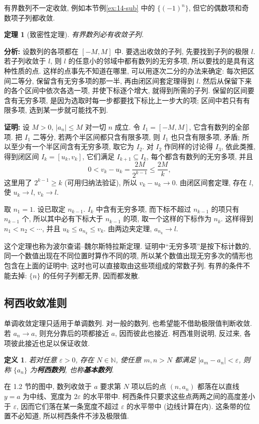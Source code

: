 \documentclass[UTF8,openany]{ctexbook}
\theoremstyle{chinesetextbook}
\newtheorem{definition}{定义}[section]
\newtheorem{theorem}{定理}[section]
\newenvironment{cnproof}{\par\indent\textbf{证明:} \ignorespaces}{\par}
\begin{document}
有界数列不一定收敛, 例如本节例\ref{ex:14-sub} 中的 $\{(-1)^n\}$, 但它的偶数项和奇数项子列都收敛.
\begin{theorem}[致密性定理]
有界数列必有收敛子列.
\end{theorem}
\par\indent\textbf{分析:} 设数列的各项都在 $[-M,M]$ 中. 要选出收敛的子列, 先要找到子列的极限 $l$. 若子列收敛于 $l$, 则 $l$ 的任意小的邻域中都有数列的无穷多项, 所以要找的是具有这种性质的点. 这样的点事先不知道在哪里, 可以用逐次二分的办法来确定: 每次把区间二等分, 保留含有无穷多项的那一半, 再由闭区间套定理得到 $l$. 然后从保留下来的各个区间中依次各选一项, 并使下标逐个增大, 就得到所需的子列. 保留的区间要含有无穷多项, 是因为选取时每一步都要找下标比上一步大的项; 区间中若只有有限多项, 选到某一步就可能找不到.
\begin{cnproof}
设 $M>0$, $|a_n|\le M$ 对一切 $n$ 成立. 令 $I_1=[-M,M]$, 它含有数列的全部项. 把 $I_1$ 二等分, 若两个半区间都只含有限多项, 则 $I_1$ 也只含有限多项, 矛盾; 所以至少有一个半区间含有无穷多项, 取它为 $I_2$. 对 $I_2$ 作同样的讨论得 $I_3$, 依此类推, 得到闭区间 $I_k=[u_k,v_k]$, 它们满足 $I_{k+1}\subseteq I_k$, 每个都含有数列的无穷多项, 并且
\[
0<v_k-u_k=\frac{2M}{2^{k-1}}\le\frac{2M}k,
\]
这里用了 $2^{k-1}\ge k$ (可用归纳法验证), 所以 $v_k-u_k\to0$. 由闭区间套定理, 存在 $l$, 使 $u_k\to l$, $v_k\to l$.

取 $n_1=1$. 设已取定 $n_{k-1}$. $I_k$ 中含有无穷多项, 而下标不超过 $n_{k-1}$ 的项只有 $n_{k-1}$ 个, 所以其中必有下标大于 $n_{k-1}$ 的项, 取一个这样的下标作为 $n_k$. 这样得到 $n_1<n_2<\cdots$, 并且 $u_k\le a_{n_k}\le v_k$. 由两边夹定理, $a_{n_k}\to l$.
\end{cnproof}
这个定理也称为波尔查诺--魏尔斯特拉斯定理. 证明中“无穷多项”是按下标计数的, 同一个数值出现在不同位置时算作不同的项, 所以某个数值出现无穷多次的情形也包含在上面的证明中; 这时也可以直接取由这些项组成的常数子列. 有界的条件不能去掉: $\{n\}$ 的任何子列都无界, 因而都发散.
\subsection{柯西收敛准则}
单调收敛定理只适用于单调数列. 对一般的数列, 也希望能不借助极限值判断收敛. 若 $a_n\to a$, 则充分靠后的项都接近 $a$, 因而彼此也接近. 柯西准则说明, 反过来, 各项彼此接近也足以保证收敛.
\begin{definition}
若对任意 $\varepsilon>0$, 存在 $N\in\mathbb N$, 使任意 $m,n>N$ 都满足 $|a_m-a_n|<\varepsilon$, 则称 $\{a_n\}$ 为\textbf{柯西数列}, 也称\textbf{基本数列}.
\end{definition}
在 1.2 节的图中, 数列收敛于 $a$ 要求第 $N$ 项以后的点 $(n,a_n)$ 都落在以直线 $y=a$ 为中线、宽度为 $2\varepsilon$ 的水平带中. 柯西条件只要求这些点两两之间的高度差小于 $\varepsilon$, 因而它们落在某一条宽度不超过 $\varepsilon$ 的水平带中 (边线计算在内). 这条带的位置不必知道, 所以柯西条件不涉及极限值.
\end{document}
